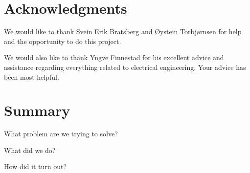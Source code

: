 \clearpage
\section{Acknowledgments}
We would like to thank Svein Erik Bratsberg and \O ystein Torbj\o rnsen for help and the opportunity to do this project.

We would also like to thank Yngve Finnestad for his excellent advice and assistance regarding everything related to electrical engineering. Your advice has been most helpful.

\section{Summary}
What problem are we trying to solve?

What did we do?

How did it turn out?


